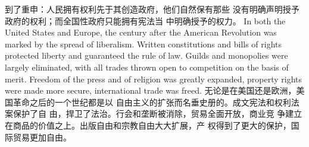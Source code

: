 \begin{paracol}{2}
到了重申：人民拥有权利先于其创造政府，他们自然保有那些
没有明确声明授予政府的权利；而全国性政府只能拥有宪法当
中明确授予的权力。
\switchcolumn*
In both the United States and Europe, the century after the
American Revolution was marked by the spread of liberalism.
Written constitutions and bills of rights protected liberty and
guaranteed the rule of law. Guilds and monopolies were largely
eliminated, with all trades thrown open to competition on the
basis of merit. Freedom of the press and of religion was greatly
expanded, property rights were made more secure, international trade was freed.
\switchcolumn
无论是在美国还是欧洲，美国革命之后的一个世纪都是以
自由主义的扩张而名垂史册的。成文宪法和权利法案保护了自
由，捍卫了法治。行会和垄断被消除，贸易全面开放，商业竞
争建立在商品的价值之上。出版自由和宗教自由大大扩展，产
权得到了更大的保护，国际贸易更加自由。


\end{paracol}
